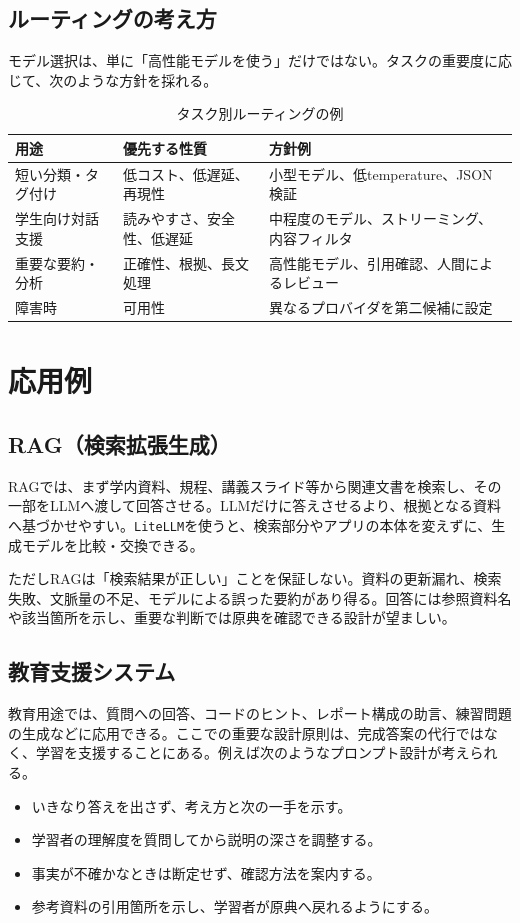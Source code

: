 \documentclass[11pt,a4paper]{bxjsarticle}
\newcommand{\litellm}{\texttt{LiteLLM}}
\begin{document}
\subsection{ルーティングの考え方}
モデル選択は、単に「高性能モデルを使う」だけではない。タスクの重要度に応じて、次のような方針を採れる。
\begin{table}[H]
\centering
\caption{タスク別ルーティングの例}
\begin{tabular}{p{42mm}p{45mm}p{48mm}}
\toprule
用途 & 優先する性質 & 方針例 \\
\midrule
短い分類・タグ付け & 低コスト、低遅延、再現性 & 小型モデル、低temperature、JSON検証 \\
学生向け対話支援 & 読みやすさ、安全性、低遅延 & 中程度のモデル、ストリーミング、内容フィルタ \\
重要な要約・分析 & 正確性、根拠、長文処理 & 高性能モデル、引用確認、人間によるレビュー \\
障害時 & 可用性 & 異なるプロバイダを第二候補に設定 \\
\bottomrule
\end{tabular}
\end{table}

\section{応用例}
\subsection{RAG（検索拡張生成）}
RAGでは、まず学内資料、規程、講義スライド等から関連文書を検索し、その一部をLLMへ渡して回答させる。LLMだけに答えさせるより、根拠となる資料へ基づかせやすい。\litellm{}を使うと、検索部分やアプリの本体を変えずに、生成モデルを比較・交換できる。

ただしRAGは「検索結果が正しい」ことを保証しない。資料の更新漏れ、検索失敗、文脈量の不足、モデルによる誤った要約があり得る。回答には参照資料名や該当箇所を示し、重要な判断では原典を確認できる設計が望ましい。

\subsection{教育支援システム}
教育用途では、質問への回答、コードのヒント、レポート構成の助言、練習問題の生成などに応用できる。ここでの重要な設計原則は、完成答案の代行ではなく、学習を支援することにある。例えば次のようなプロンプト設計が考えられる。
\begin{itemize}
  \item いきなり答えを出さず、考え方と次の一手を示す。
  \item 学習者の理解度を質問してから説明の深さを調整する。
  \item 事実が不確かなときは断定せず、確認方法を案内する。
  \item 参考資料の引用箇所を示し、学習者が原典へ戻れるようにする。
\end{itemize}
\end{document}
